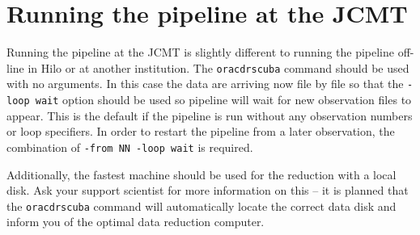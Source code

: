 \documentclass[twoside,11pt]{article}
\newcommand{\xlabel}[1]{}
\renewcommand{\_}{\texttt{\symbol{95}}}
\begin{document}
\section{Running the pipeline at the JCMT\xlabel{running_the_pipeline_at_the_jcmt}}

Running the pipeline at the JCMT is slightly different to running the pipeline
off-line in Hilo or at another institution.  The \texttt{oracdr\_scuba} command
should be used with no arguments.  In this case the data are arriving now file
by file so that the \texttt{-loop wait} option should be used so pipeline will
wait for new observation files to appear. This is the default if the pipeline
is run without any observation numbers or loop specifiers.  In order to
restart the pipeline from a later observation, the combination of
\texttt{-from NN -loop wait} is required.

Additionally, the fastest machine should be used for the reduction
with a local disk. Ask your support scientist for more information
on this -- it is planned that the \texttt{oracdr\_scuba} command
will automatically locate the correct data disk and inform you
of the optimal data reduction computer.



\end{document}
